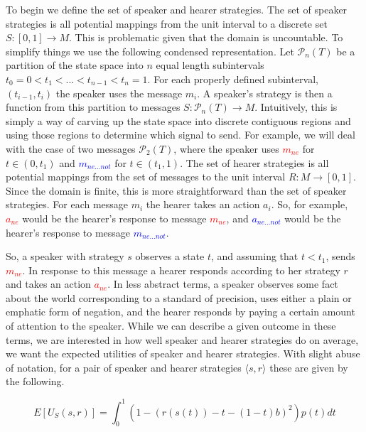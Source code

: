 \documentclass[linguex]{sp}
\theoremstyle{definition} \newtheorem{definition}{Definition}
\begin{document}
To begin we define the set of speaker and hearer strategies. The set of speaker strategies is all potential mappings from the unit interval to a discrete set $S : [0,1] \rightarrow M$. This is problematic given that the domain is uncountable. To simplify things we use the following condensed representation. Let $\mathcal{P}_n(T)$ be a partition of the state space into $n$ equal length subintervals $t_0 = 0 < t_1 < ... < t_{n-1} < t_n = 1$.  For each properly defined subinterval, $(t_{i-1},t_i)$ the speaker uses the message $m_i$. A speaker's strategy is then a function from this partition to messages $S : \mathcal{P}_n(T) \rightarrow M$.  Intuitively, this is simply a way of carving up the state space into discrete contiguous regions and using those regions to determine which signal to send. For example, we will deal with the case of two messages $\mathcal{P}_2(T)$, where the speaker uses  \emph{\textcolor{red}{$m_{ne}$}} for $t \in (0, t_1)$ and  \emph{\textcolor{blue}{$m_{ne...not}$}}  for $t \in (t_1, 1)$. The set of hearer strategies is all potential mappings from the set of messages to the unit interval $R : M \rightarrow [0,1]$. Since the domain is finite, this is more straightforward than the set of speaker strategies. For each message $m_i$ the hearer takes an action $a_i$. So, for example, \emph{\textcolor{red}{$a_{ne}$}} would be the hearer's response to message \emph{\textcolor{red}{$m_{ne}$}}, and \emph{\textcolor{blue}{$a_{ne...not}$}}  would be the hearer's response to message \emph{\textcolor{blue}{$m_{ne...not}$}}. 

So, a speaker with strategy $s$ observes a state $t$, and assuming that $t < t_1$, sends  \emph{\textcolor{red}{$m_{ne}$}}. In response to this message a hearer responds according to her strategy $r$ and takes an action  \emph{\textcolor{red}{$a_{ne}$}}. In less abstract terms, a speaker observes some fact about the world corresponding to a standard of precision, uses either a plain or emphatic form of negation, and the hearer responds by paying a certain amount of attention to the speaker. While we can describe a given outcome in these terms, we are  interested in how well speaker and hearer strategies do on average, we want the expected utilities of speaker and hearer strategies. With slight abuse of notation, for a pair of speaker and hearer strategies $\langle s, r \rangle$ these are given by the following.

\begin{equation}
     E[U_S(s, r)] = \int_0^1 \left( 1 -(r(s(t)) - t - (1-t)b)^2 \right)p(t)dt
\end{equation}
\end{document}
